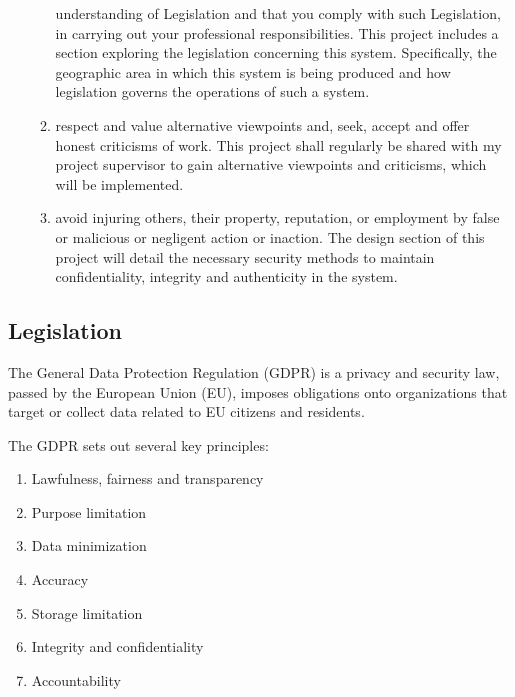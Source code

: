 \documentclass{report}
\begin{document}
\begin{flushleft}
\begin{enumerate}
\begin{enumerate}
    understanding of Legislation and that you comply
    with such Legislation, in carrying out your
    professional responsibilities.
    This project includes a section exploring the
    legislation concerning this system. Specifically, the
    geographic area in which this system is being
    produced and how legislation governs the operations
    of such a system.
    \item respect and value alternative viewpoints and,
    seek, accept and offer honest criticisms of work.
    This project shall regularly be shared with my project
    supervisor to gain alternative viewpoints and
    criticisms, which will be implemented.
    \item avoid injuring others, their property, reputation,
    or employment by false or malicious or negligent
    action or inaction.
    The design section of this project will detail the
    necessary security methods to maintain
    confidentiality, integrity and authenticity in the
    system. %
 \end{enumerate}
 \end{enumerate}

 \subsection{Legislation}
 The General Data Protection Regulation (GDPR) is a privacy
 and security law, passed by the European Union (EU),
 imposes obligations onto organizations that target or collect
 data related to EU citizens and residents.\cite{noauthor_general_nodate} \linebreak[1]

The GDPR sets out several key principles:
\begin{enumerate}
  \item Lawfulness, fairness and transparency
  \item Purpose limitation
  \item Data minimization
  \item Accuracy
  \item Storage limitation
  \item Integrity and confidentiality
  \item Accountability
\end{enumerate}


\end{flushleft}
\end{document}
